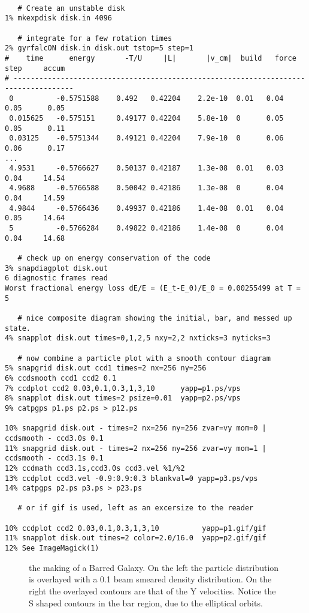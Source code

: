 \footnotesize\begin{verbatim}

   # Create an unstable disk
1% mkexpdisk disk.in 4096 

   # integrate for a few rotation times
2% gyrfalcON disk.in disk.out tstop=5 step=1
#    time      energy       -T/U     |L|       |v_cm|  build   force    step     accum
# ------------------------------------------------------------------------------------
 0          -0.5751588    0.492   0.42204    2.2e-10  0.01   0.04       0.05      0.05
 0.015625   -0.575151     0.49177 0.42204    5.8e-10  0      0.05       0.05      0.11
 0.03125    -0.5751344    0.49121 0.42204    7.9e-10  0      0.06       0.06      0.17
...
 4.9531     -0.5766627    0.50137 0.42187    1.3e-08  0.01   0.03       0.04     14.54
 4.9688     -0.5766588    0.50042 0.42186    1.3e-08  0      0.04       0.04     14.59
 4.9844     -0.5766436    0.49937 0.42186    1.4e-08  0.01   0.04       0.05     14.64
 5          -0.5766284    0.49822 0.42186    1.4e-08  0      0.04       0.04     14.68

   # check up on energy conservation of the code
3% snapdiagplot disk.out
6 diagnostic frames read
Worst fractional energy loss dE/E = (E_t-E_0)/E_0 = 0.00255499 at T = 5

   # nice composite diagram showing the initial, bar, and messed up state.
4% snapplot disk.out times=0,1,2,5 nxy=2,2 nxticks=3 nyticks=3

   # now combine a particle plot with a smooth contour diagram
5% snapgrid disk.out ccd1 times=2 nx=256 ny=256
6% ccdsmooth ccd1 ccd2 0.1
7% ccdplot ccd2 0.03,0.1,0.3,1,3,10      yapp=p1.ps/vps
8% snapplot disk.out times=2 psize=0.01  yapp=p2.ps/vps 
9% catpgps p1.ps p2.ps > p12.ps

10% snapgrid disk.out - times=2 nx=256 ny=256 zvar=vy mom=0 | ccdsmooth - ccd3.0s 0.1
11% snapgrid disk.out - times=2 nx=256 ny=256 zvar=vy mom=1 | ccdsmooth - ccd3.1s 0.1
12% ccdmath ccd3.1s,ccd3.0s ccd3.vel %1/%2
13% ccdplot ccd3.vel -0.9:0.9:0.3 blankval=0 yapp=p3.ps/vps
14% catpgps p2.ps p3.ps > p23.ps

   # or if gif is used, left as an excersize to the reader

10% ccdplot ccd2 0.03,0.1,0.3,1,3,10          yapp=p1.gif/gif
11% snapplot disk.out times=2 color=2.0/16.0  yapp=p2.gif/gif
12% See ImageMagick(1)

\end{verbatim}\normalsize

\begin{figure}[t]
\caption{the making of a Barred Galaxy. On the left the particle distribution
is overlayed with a 0.1 beam smeared density distribution. On the right
the overlayed contours are that of the Y velocities. Notice the S shaped
contours in the bar region, due to the elliptical orbits.
}
\end{figure}


